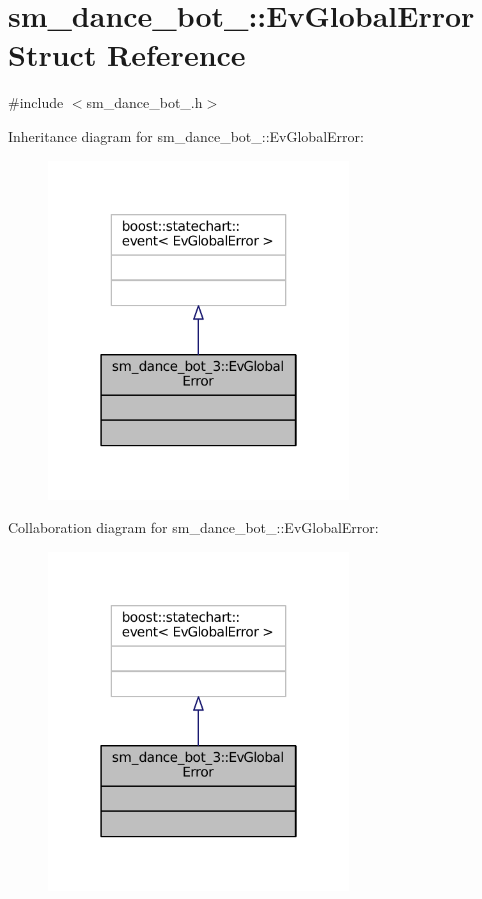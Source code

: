 \hypertarget{structsm__dance__bot__3_1_1EvGlobalError}{}\section{sm\+\_\+dance\+\_\+bot\+\_\+:\+:Ev\+Global\+Error Struct Reference}
\label{structsm__dance__bot__3_1_1EvGlobalError}


{\ttfamily \#include $<$sm\+\_\+dance\+\_\+bot\+\_.\+h$>$}



Inheritance diagram for sm\+\_\+dance\+\_\+bot\+\_\+:\+:Ev\+Global\+Error\+:
\nopagebreak
\begin{figure}[H]
\begin{center}
\leavevmode
\includegraphics[width=226pt]{structsm__dance__bot__3_1_1EvGlobalError__inherit__graph}
\end{center}
\end{figure}


Collaboration diagram for sm\+\_\+dance\+\_\+bot\+\_\+:\+:Ev\+Global\+Error\+:
\nopagebreak
\begin{figure}[H]
\begin{center}
\leavevmode
\includegraphics[width=226pt]{structsm__dance__bot__3_1_1EvGlobalError__coll__graph}
\end{center}
\end{figure}


